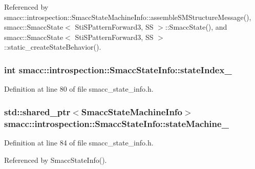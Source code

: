 Referenced by smacc\+::introspection\+::\+Smacc\+State\+Machine\+Info\+::assemble\+S\+M\+Structure\+Message(), smacc\+::\+Smacc\+State$<$ Sti\+S\+Pattern\+Forward3, S\+S $>$\+::\+Smacc\+State(), and smacc\+::\+Smacc\+State$<$ Sti\+S\+Pattern\+Forward3, S\+S $>$\+::static\+\_\+create\+State\+Behavior().

\subsubsection[{\texorpdfstring{state\+Index\+\_\+}{stateIndex_}}]{\setlength{\rightskip}{0pt plus 5cm}int smacc\+::introspection\+::\+Smacc\+State\+Info\+::state\+Index\+\_\+}\hypertarget{classsmacc_1_1introspection_1_1SmaccStateInfo_a2354fa7abf158f0c29ab71c3125c9801}{}\label{classsmacc_1_1introspection_1_1SmaccStateInfo_a2354fa7abf158f0c29ab71c3125c9801}


Definition at line 80 of file smacc\+\_\+state\+\_\+info.\+h.

\subsubsection[{\texorpdfstring{state\+Machine\+\_\+}{stateMachine_}}]{\setlength{\rightskip}{0pt plus 5cm}std\+::shared\+\_\+ptr$<${\bf Smacc\+State\+Machine\+Info}$>$ smacc\+::introspection\+::\+Smacc\+State\+Info\+::state\+Machine\+\_\+}\hypertarget{classsmacc_1_1introspection_1_1SmaccStateInfo_a74685e4540842ee292a80a1db44818bb}{}\label{classsmacc_1_1introspection_1_1SmaccStateInfo_a74685e4540842ee292a80a1db44818bb}


Definition at line 84 of file smacc\+\_\+state\+\_\+info.\+h.



Referenced by Smacc\+State\+Info().

